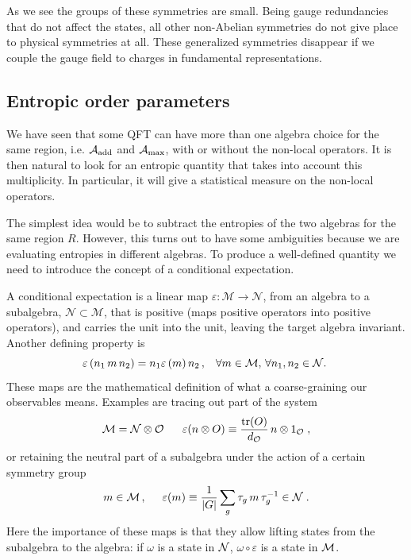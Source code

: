 \documentclass[12pt]{article}
\numberwithin{equation}{section}
\newcommand{\be}{\begin{equation}}
\newcommand{\ee}{\end{equation}}
\begin{document}
As we see the groups of these symmetries are small. Being gauge redundancies that do not affect the states, all other non-Abelian symmetries do not give place to physical symmetries at all. These generalized symmetries disappear if we couple the gauge field to charges in fundamental representations.   


\subsection{Entropic order parameters}

We have seen that some QFT can have more than one algebra choice for the same region, i.e. ${\cal A}_{\textrm{add}}$ and ${\cal A}_{\textrm{max}}$, with or without the non-local operators. It is then natural to look for an entropic quantity that takes into account this multiplicity. In particular, it will give a statistical measure on the non-local operators.   

The simplest idea would be to subtract the entropies of the two algebras for the same region $R$. However, this turns out to have some ambiguities because we are evaluating entropies in different algebras. To produce a well-defined quantity we need to introduce the concept of a conditional expectation. 

A conditional expectation is a linear map $\varepsilon : \mathcal{M}\rightarrow \mathcal{N}$,  from an algebra to a subalgebra, $\mathcal{N}\subset\mathcal{M}$, that is positive (maps positive operators into positive operators), and carries the unit into the unit, leaving the target algebra invariant. Another defining property is
\be
\hspace{-1mm} \varepsilon\left(n_{1}\,m\,n_{2}\right)=n_{1}\varepsilon\left(m\right)n_{2}\,,\hspace{3mm} \forall m\in\mathcal{M},\,\forall n_{1},n_{2}\in\mathcal{N}.\label{ce_def_prop}
\ee
These maps are the mathematical definition of what a coarse-graining  our observables means. Examples are tracing out part of the system
\be 
\mathcal{M}=\mathcal{N}\otimes\mathcal{O}\,\,\,\,\,\,\,\,\,\, \varepsilon(n\otimes O)\equiv \frac{\textrm{tr}(O)}{d_{\cal O}}\, n\otimes 1_{\mathcal{O}}\;,
\ee
or retaining the neutral part of a subalgebra under the action of a certain symmetry group
\be 
m\in \mathcal{M}\,,\hspace{.5cm} \varepsilon(m)\equiv \frac{1}{|G|}\sum\limits_{g}\tau_g \,m\,\tau_{g}^{-1}\in {\cal N}\;.\label{grupo}
\ee
Here the importance of these maps is that they allow lifting states from the subalgebra to the algebra: if $\omega$ is a state in ${\cal N}$, $\omega\circ \varepsilon$ is a state in ${\cal M}$. 
\end{document}
